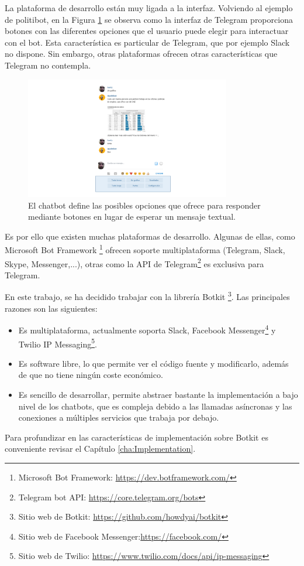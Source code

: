 La plataforma de desarrollo están muy ligada a la interfaz. Volviendo al ejemplo de politibot, en la Figura \ref{fig:PolitibotBotones} se observa como la interfaz de Telegram proporciona botones con las diferentes opciones que el usuario puede elegir para interactuar con el bot. Esta característica es particular de Telegram, que por ejemplo Slack no dispone. Sin embargo, otras plataformas ofrecen otras características que Telegram no contempla.
\begin{figure}[htb]
	\centering
	\includegraphics[width=0.8\textwidth]{./figs/PolitibotBotones.png}
	\caption{El chatbot define las posibles opciones que ofrece para responder mediante botones en lugar de esperar un mensaje textual.}
	\label{fig:PolitibotBotones}
\end{figure}

Es por ello que existen muchas plataformas de desarrollo. Algunas de ellas, como Microsoft Bot Framework \footnote{Microsoft Bot Framework: \url{https://dev.botframework.com/}} ofrecen soporte multiplataforma (Telegram, Slack, Skype, Messenger,...), otras como la API de Telegram\footnote{Telegram bot API: \url{https://core.telegram.org/bots}} es exclusiva para Telegram.

En este trabajo, se ha decidido trabajar con la librería Botkit \footnote{Sitio web de Botkit: \url{https://github.com/howdyai/botkit}}. Las principales razones son las siguientes:
\begin{itemize}
	\item Es multiplataforma, actualmente soporta Slack, Facebook Messenger\footnote{Sitio web de Facebook Messenger:\url{https://facebook.com/}} y Twilio IP Messaging\footnote{Sitio web de Twilio: \url{https://www.twilio.com/docs/api/ip-messaging}}.
	\item Es software libre, lo que permite ver el código fuente y modificarlo, además de que no tiene ningún coste económico.
	\item Es sencillo de desarrollar, permite abstraer bastante la implementación a bajo nivel de los chatbots, que es compleja debido a las llamadas asíncronas y las conexiones a múltiples servicios que trabaja por debajo.
\end{itemize}

Para profundizar en las características de implementación sobre Botkit es conveniente revisar el Capítulo \ref{cha:Implementation}.